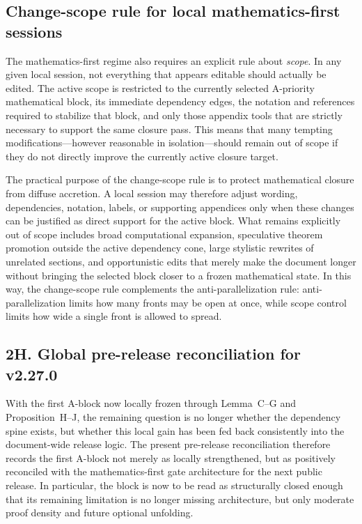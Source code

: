 \subsection*{Change-scope rule for local mathematics-first sessions}
The mathematics-first regime also requires an explicit rule about \emph{scope}. In any given local session, not everything that appears editable should actually be edited. The active scope is restricted to the currently selected A-priority mathematical block, its immediate dependency edges, the notation and references required to stabilize that block, and only those appendix tools that are strictly necessary to support the same closure pass. This means that many tempting modifications---however reasonable in isolation---should remain out of scope if they do not directly improve the currently active closure target.

The practical purpose of the change-scope rule is to protect mathematical closure from diffuse accretion. A local session may therefore adjust wording, dependencies, notation, labels, or supporting appendices only when these changes can be justified as direct support for the active block. What remains explicitly out of scope includes broad computational expansion, speculative theorem promotion outside the active dependency cone, large stylistic rewrites of unrelated sections, and opportunistic edits that merely make the document longer without bringing the selected block closer to a frozen mathematical state. In this way, the change-scope rule complements the anti-parallelization rule: anti-parallelization limits how many fronts may be open at once, while scope control limits how wide a single front is allowed to spread.





\subsection*{2H. Global pre-release reconciliation for v2.27.0}
With the first A-block now locally frozen through Lemma~C--G and Proposition~H--J, the remaining question is no longer whether the dependency spine exists, but whether this local gain has been fed back consistently into the document-wide release logic. The present pre-release reconciliation therefore records the first A-block not merely as locally strengthened, but as positively reconciled with the mathematics-first gate architecture for the next public release. In particular, the block is now to be read as structurally closed enough that its remaining limitation is no longer missing architecture, but only moderate proof density and future optional unfolding.

